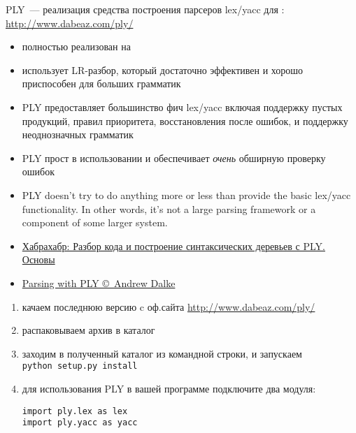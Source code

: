 \secdown

PLY\ --- реализация средства построения парсеров lex/yacc для \py:
\url{http://www.dabeaz.com/ply/}

\bigskip
\begin{itemize}[nosep]
  \item 
  полностью реализован на \py
  \item 
  использует LR-разбор, который достаточно эффективен и хорошо приспособен для
  больших грамматик
  \item 
  PLY предоставляет большинство фич lex/yacc включая поддержку пустых продукций,
  правил приоритета, восстановления после ошибок, и поддержку неоднозначных
  грамматик
  \item
  PLY прост в использовании и обеспечивает \emph{очень} обширную проверку
  ошибок
  \item 
  PLY doesn't try to do anything more or less than provide the basic lex/yacc
  functionality.
  In other words, it's not a large parsing framework or a
  component of some larger system.
\end{itemize}

\begin{itemize}
  \item 
\href{https://habrahabr.ru/post/191252/}{Хабрахабр: Разбор кода и построение
синтаксических деревьев с PLY.
Основы}
  \item 
\href{http://www.dalkescientific.com/writings/NBN/parsing_with_ply.html}{Parsing
with PLY \copyright\ Andrew Dalke}
\end{itemize}

\clearpage
{}

\begin{enumerate}
  \item
  качаем последнюю версию  c оф.сайта
  \url{http://www.dabeaz.com/ply/}
  \item
  распаковываем архив в каталог 
  \item
  заходим в полученный каталог из командной строки, и запускаем\\
  \verb|python setup.py install|
  \item для использования PLY в вашей программе подключите два модуля:
\begin{verbatim}
import ply.lex as lex
import ply.yacc as yacc  
\end{verbatim}
\end{enumerate}

